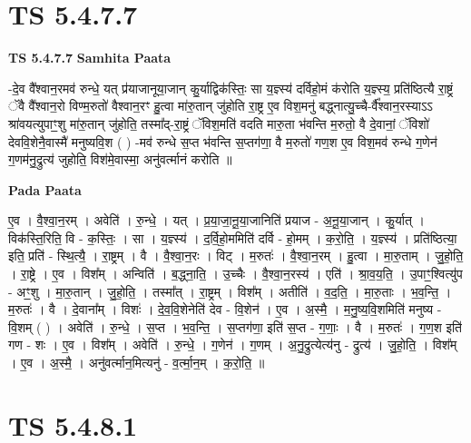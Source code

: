 \documentclass[17pt]{extarticle}
\begin{document}
\section*{ TS 5.4.7.7 }

\textbf{TS 5.4.7.7 } \newline
\textbf{Samhita Paata} \newline

-दे॒व वै᳚श्वान॒रमव॑ रुन्धे॒ यत् प्र॑याजानूया॒जान् कु॒र्याद्विक॑स्तिः॒ सा य॒ज्ञ्स्य॑ दर्विहो॒मं क॑रोति य॒ज्ञ्स्य॒ प्रति॑ष्ठित्यै रा॒ष्ट्रं ॅवै वै᳚श्वान॒रो विण्म॒रुतो॑ वैश्वान॒रꣳ हु॒त्वा मा॑रु॒तान् जु॑होति रा॒ष्ट्र ए॒व विश॒मनु॑ बद्ध्नात्यु॒च्चै-र्वै᳚श्वान॒रस्याऽऽ श्रा॑वयत्युपाꣳ॒॒शु मा॑रु॒तान् जु॑होति॒ तस्मा᳚द्-रा॒ष्ट्रं ॅविश॒मति॑ वदति मारु॒ता भ॑वन्ति म॒रुतो॒ वै दे॒वानां॒ ॅविशो॑ देववि॒शेनै॒वास्मै॑ मनुष्यवि॒श ( ) -मव॑ रुन्धे स॒प्त भ॑वन्ति स॒प्तग॑णा॒ वै म॒रुतो॑ गण॒श ए॒व विश॒मव॑ रुन्धे ग॒णेन॑ ग॒णम॑नु॒द्रुत्य॑ जुहोति॒ विश॑मे॒वास्मा॒ अनु॑वर्त्मानं करोति ॥ \newline

\textbf{Pada Paata} \newline

ए॒व । वै॒श्वा॒न॒रम् । अवेति॑ । रु॒न्धे॒ । यत् । प्र॒या॒जा॒नू॒या॒जानिति॑ प्रयाज - अ॒नू॒या॒जान् । कु॒र्यात् । विक॑स्ति॒रिति॒ वि - क॒स्तिः॒ । सा । य॒ज्ञ्स्य॑ । द॒र्वि॒हो॒ममिति॑ दर्वि - हो॒मम् । क॒रो॒ति॒ । य॒ज्ञ्स्य॑ । प्रति॑ष्ठित्या॒ इति॒ प्रति॑ - स्थि॒त्यै॒ । रा॒ष्ट्रम् । वै । वै॒श्वा॒न॒रः । विट् । म॒रुतः॑ । वै॒श्वा॒न॒रम् । हु॒त्वा । मा॒रु॒ताम् । जु॒हो॒ति॒ । रा॒ष्ट्रे । ए॒व । विश᳚म् । अन्विति॑ । ब॒द्ध्ना॒ति॒ । उ॒च्चैः । वै॒श्वा॒न॒रस्य॑ । एति॑ । श्रा॒व॒य॒ति॒ । उ॒पाꣳ॒॒श्वित्यु॑प - अꣳ॒॒शु । मा॒रु॒तान् । जु॒हो॒ति॒ । तस्मा᳚त् । रा॒ष्ट्रम् । विश᳚म् । अतीति॑ । व॒द॒ति॒ । मा॒रु॒ताः । भ॒व॒न्ति॒ । म॒रुतः॑ । वै । दे॒वाना᳚म् । विशः॑ । दे॒व॒वि॒शेनेति॑ देव - वि॒शेन॑ । ए॒व । अ॒स्मै॒ । म॒नु॒ष्य॒वि॒शमिति॑ मनुष्य - वि॒शम् ( ) । अवेति॑ । रु॒न्धे॒ । स॒प्त । भ॒व॒न्ति॒ । स॒प्तग॑णा॒ इति॑ स॒प्त - ग॒णाः॒ । वै । म॒रुतः॑ । ग॒ण॒श इति॑ गण - शः । ए॒व । विश᳚म् । अवेति॑ । रु॒न्धे॒ । ग॒णेन॑ । ग॒णम् । अ॒नु॒द्रुत्येत्य॑नु - द्रुत्य॑ । जु॒हो॒ति॒ । विश᳚म् । ए॒व । अ॒स्मै॒ । अनु॑वर्त्मान॒मित्यनु॑ - व॒र्त्मा॒न॒म् । क॒रो॒ति॒ ॥  \newline




\section*{ TS 5.4.8.1 }
\end{document}
